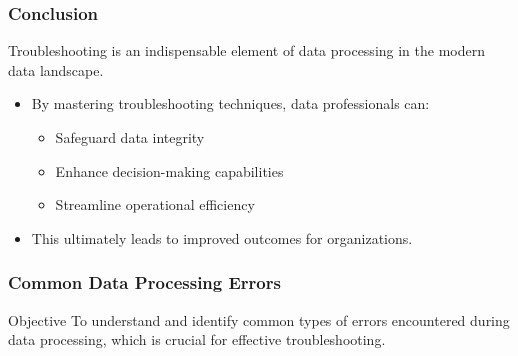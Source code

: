 \documentclass[aspectratio=169]{beamer}
\begin{document}
\begin{frame}[fragile]
    \frametitle{Conclusion}
    Troubleshooting is an indispensable element of data processing in the modern data landscape. 
    \begin{itemize}
        \item By mastering troubleshooting techniques, data professionals can:
            \begin{itemize}
                \item Safeguard data integrity
                \item Enhance decision-making capabilities
                \item Streamline operational efficiency
            \end{itemize}
        \item This ultimately leads to improved outcomes for organizations.
    \end{itemize}
\end{frame}

\begin{frame}
    \frametitle{Common Data Processing Errors}
    \begin{block}{Objective}
        To understand and identify common types of errors encountered during data processing, which is crucial for effective troubleshooting.
    \end{block}
\end{frame}
\end{document}
